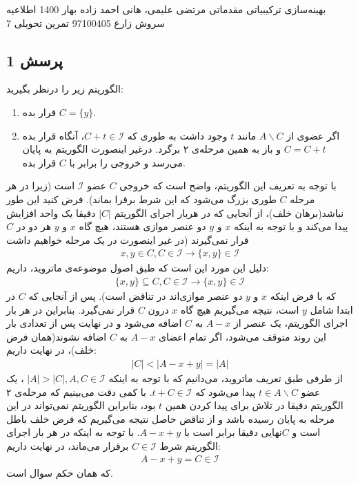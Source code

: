\documentclass[a4paper,12pt]{article}
\newcounter{problemcounter}
\newcounter{subproblemcounter}
\newcommand{\problem}[1]
{
	\subsection*{
		پرسش
		#1
	}
}
\begin{document}
\handout
{بهینه‌سازی ترکیبیاتی مقدماتی}
{مرتضی علیمی، هانی احمد زاده}
{بهار 1400}
{اطلاعیه}
{سروش زارع}
{97100405}
 {تمرین تحویلی 7}
\problem{1}
الگوریتم زیر را درنظر بگیرید:
\begin{enumerate}
	\item قرار بده $C = \{y\}$.
	\item اگر عضوی از $A \backslash C$ مانند $t$ وجود داشت به طوری که $C + t \in \mathcal{I}$، آنگاه قرار بده $C = C + t$ و باز به همین مرحله‌ی ۲ برگرد. درغیر اینصورت الگوریتم به پایان می‌رسد و خروجی را برابر با $C$ قرار بده.
\end{enumerate}

با توجه به تعریف این الگوریتم، واضح است که خروجی $C$ عضو $\mathcal{I}$ است (زیرا در هر مرحله $C$ طوری بزرگ می‌شود که این شرط برقرا بماند).
\proof{}
فرض کنید این طور نباشد(برهان خلف)، از آنجایی که در هربار اجرای الگوریتم $|C|$ دقیقا یک واحد افزایش پیدا می‌کند و با توجه به اینکه $x$ و $y$ دو عنصر موازی هستند، هیچ گاه $x$ و $y$ هر دو در $C$ قرار نمی‌گیرند (در غیر اینصورت در یک مرحله خواهیم داشت
\begin{align*}
	x , y \in C, C \in \mathcal{I} \rightarrow \{x,y\} \in \mathcal{I}
\end{align*} 
دلیل این مورد این است که طبق اصول موضوعه‌ی ماتروید،  داریم:
\begin{align*}
\{x,y\} \subseteq C , C \in \mathcal{I} \rightarrow \{x,y\} \in \mathcal{I}
\end{align*}
که با فرض اینکه $x$ و $y$ دو عنصر موازی‌اند در تناقض است).
پس از آنجایی که $C$ در ابتدا شامل $y$ است، نتیجه می‌گیریم هیچ گاه $x$ درون $C$ قرار نمی‌گیرد. بنابراین در هر بار اجرای الگوریتم، یک عنصر از $A - x$ به $C$ اضافه می‌شود و در نهایت پس از تعدادی بار این روند متوقف می‌شود، اگر تمام اعضای $A - x$ به $C$ اضافه نشوند(همان فرض خلف)، در نهایت داریم:
\begin{align*}
|C| < |A - x + y| = |A|	
\end{align*}
از طرفی طبق تعریف ماتروید، می‌دانیم که با توجه به اینکه
$|A| > |C| , A,C \in \mathcal{I}$
، یک عضو
$t \in A \backslash C$
پیدا می‌شود که
$t + C \in \mathcal{I}$.
با کمی دقت می‌بینیم که مرحله‌ی ۲ الگوریتم دقیقا در تلاش برای پیدا کردن همین $t$ بود، بنابراین الگوریتم نمی‌تواند در این مرحله به پایان رسیده باشد و از تناقض حاصل نتیجه می‌گیریم که فرض خلف باطل است و $C$نهایی دقیقا برابر است با
$A - x +y$.
با توجه به اینکه در هر بار اجرای الگوریتم شرط
$C \in \mathcal{I}$
برقرار می‌ماند، در نهایت داریم:
\begin{align*}
	A - x + y = C \in \mathcal{I}
\end{align*}
که همان حکم سوال است.
\end{document}
